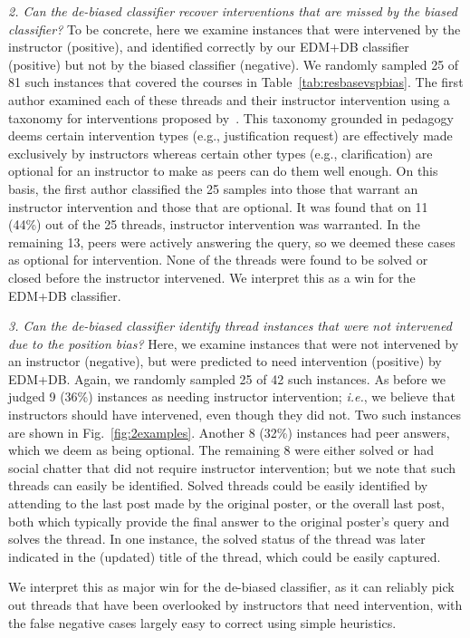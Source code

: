 \documentclass[11pt,a4paper]{article}
\begin{document}
{\it 2. Can the de-biased classifier recover interventions that 
are missed by the biased classifier?}  To be concrete, here we 
examine instances that were intervened by the instructor 
(positive), and identified correctly by our EDM+DB classifier 
(positive) but not by the biased classifier (negative). We 
randomly sampled 25 of 81 such instances that covered the courses 
in Table~\ref{tab:resbasevspbias}. The first author examined each 
of these threads and their instructor intervention using a taxonomy 
for interventions proposed by~\cite{chandrasekaran2015towards}. 
This taxonomy grounded in pedagogy deems certain intervention 
types (e.g., justification request) are effectively made exclusively 
by instructors whereas certain other types (e.g., clarification) are 
optional for an instructor to make as peers can do them well enough. 
On this basis, the first author classified the 25 samples into 
those that warrant an instructor intervention and those that 
are optional. It was found that on 11 (44\%) out of 
the 25 threads, instructor intervention was warranted. In the 
remaining 13, peers were actively answering the query, so we 
deemed these cases as optional for intervention. None of the 
threads were found to be solved or closed before the instructor 
intervened. We interpret this as a win for the EDM+DB 
classifier.

{\it 3. Can the de-biased classifier identify thread instances 
that were not intervened due to the position bias?}  Here, we 
examine instances that were not intervened by an instructor 
(negative), but were predicted to need intervention (positive) 
by EDM+DB. Again, we randomly sampled 25 of 42 such instances. As before 
we judged 9 (36\%) instances as needing instructor intervention; {\it 
i.e.}, we believe that instructors should have intervened, even 
though they did not. Two such instances are shown in 
Fig.~\ref{fig:2examples}. Another 8 (32\%) instances had peer 
answers, which we deem as being optional. The
remaining 8 were either solved or had social chatter that did not
require instructor intervention; but we note that such threads 
can easily be identified. Solved threads could be easily 
identified by attending to the last post made by the original 
poster, or the overall last post, both which typically provide 
the final answer to the original poster's query and solves the 
thread. In one instance, the solved status of the thread was 
later indicated in the (updated) title of the thread, which could 
be easily captured.

We interpret this as major win for the de-biased classifier, 
as it can reliably pick out threads that have been overlooked 
by instructors that need intervention, with the false negative 
cases largely easy to correct using simple heuristics.
\end{document}

